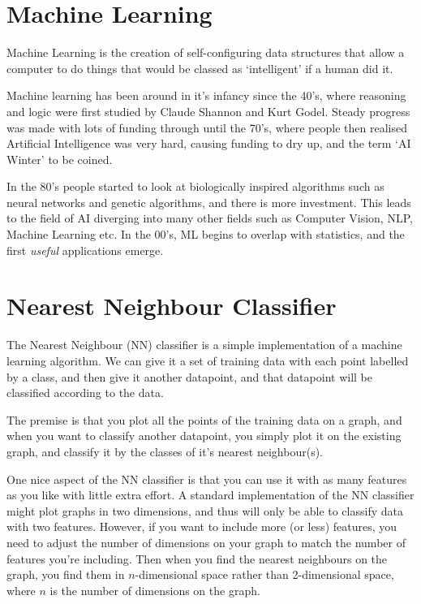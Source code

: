 
\section{Machine Learning}

Machine Learning is the creation of self-configuring data structures that allow
a computer to do things that would be classed as `intelligent' if a human did
it.

Machine learning has been around in it's infancy since the 40's, where reasoning
and logic were first studied by Claude Shannon and Kurt Godel. Steady progress
was made with lots of funding through until the 70's, where people then realised
Artificial Intelligence was very hard, causing funding to dry up, and the term
`AI Winter' to be coined.

In the 80's people started to look at biologically inspired algorithms such as
neural networks and genetic algorithms, and there is more investment. This leads
to the field of AI diverging into many other fields such as Computer Vision,
NLP, Machine Learning etc. In the 00's, ML begins to overlap with statistics,
and the first {\it useful} applications emerge.

\section{Nearest Neighbour Classifier}

The Nearest Neighbour (NN) classifier is a simple implementation of a machine
learning algorithm. We can give it a set of training data with each point
labelled by a class, and then give it another datapoint, and that datapoint will
be classified according to the data.

The premise is that you plot all the points of the training data on a graph, and
when you want to classify another datapoint, you simply plot it on the existing
graph, and classify it by the classes of it's nearest neighbour(s).


One nice aspect of the NN classifier is that you can use it with as many
features as you like with little extra effort. A standard implementation of the
NN classifier might plot graphs in two dimensions, and thus will only be able to
classify data with two features. However, if you want to include more (or less)
features, you need to adjust the number of dimensions on your graph to match the
number of features you're including. Then when you find the nearest neighbours
on the graph, you find them in $n$-dimensional space rather than 2-dimensional
space, where $n$ is the number of dimensions on the graph.

